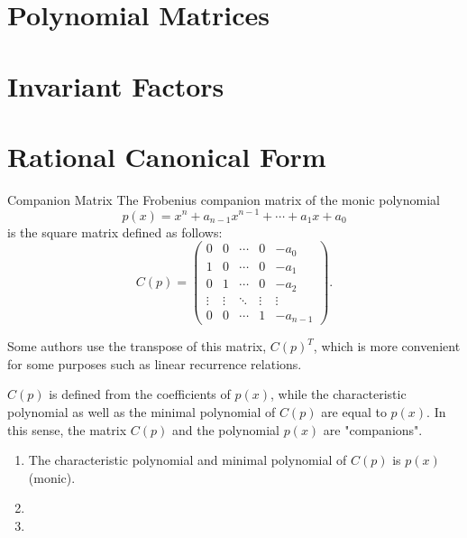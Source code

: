 \documentclass[11pt]{../../TexTemplate/elegantbook} %
\begin{document}
\section{Polynomial Matrices}

\section{Invariant Factors}

\section{Rational Canonical Form}
\begin{definition}{Companion Matrix}
    The Frobenius companion matrix of the monic polynomial
    \[
    p(x) = x^n + a_{n-1}x^{n-1} + \cdots + a_1 x + a_0
    \]
    is the square matrix defined as follows:
    \[
    C(p) = \begin{pmatrix}
    0 & 0 & \cdots & 0 & -a_0 \\
    1 & 0 & \cdots & 0 & -a_1 \\
    0 & 1 & \cdots & 0 & -a_2 \\
    \vdots & \vdots & \ddots & \vdots & \vdots \\
    0 & 0 & \cdots & 1 & -a_{n-1}
    \end{pmatrix}.
    \]
\end{definition}

Some authors use the transpose of this matrix, \(C(p)^{T}\), 
which is more convenient for some purposes such as linear recurrence relations.

\(C(p)\) is defined from the coefficients of \(p(x)\), 
while the characteristic polynomial as well as the minimal polynomial of \(C(p)\) are equal to \(p(x)\). 
In this sense, the matrix \(C(p)\) and the polynomial \(p(x)\) are "companions".

\begin{property}
    \begin{enumerate}
        \item The characteristic polynomial and minimal polynomial of \( C(p) \) is \( p(x) \) (monic).
        \item  
        \item 
    \end{enumerate}
\end{property}
\end{document}
